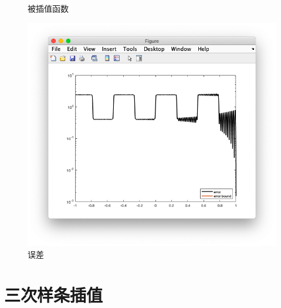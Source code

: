 \documentclass[]{report}
\begin{document}
\begin{figure}[h!]
\begin{minipage}{13em}
				\caption{被插值函数}
			\end{minipage}
			\begin{minipage}{13em}
				\centering
				\includegraphics[scale = 0.2]{images/1_1_4_R.png}
				\caption{误差}
			\end{minipage}
		\end{figure}

	\section{三次样条插值}
\end{document}
